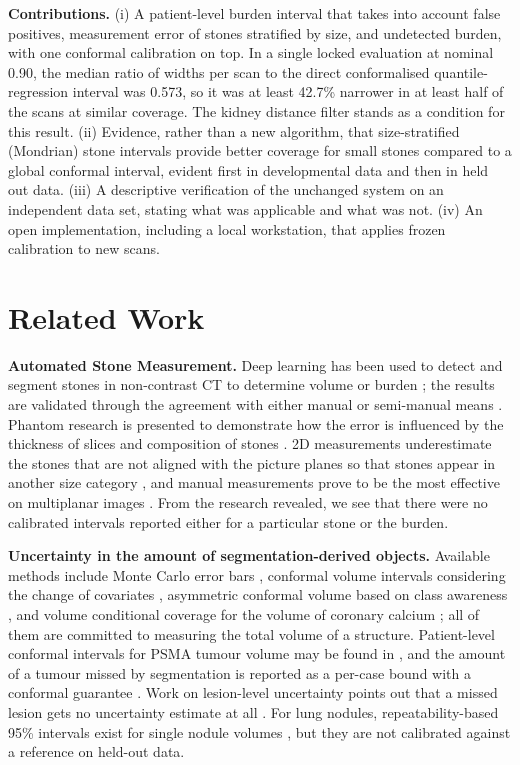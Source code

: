 \documentclass[conference]{IEEEtran}
\begin{document}
\textbf{Contributions.} (i) A patient-level burden interval that takes into account false positives, measurement error of stones stratified by size, and undetected burden, with one conformal calibration on top. In a single locked evaluation at nominal 0.90, the median ratio of widths per scan to the direct conformalised quantile-regression interval was 0.573, so it was at least 42.7\% narrower in at least half of the scans at similar coverage. The kidney distance filter stands as a condition for this result. (ii) Evidence, rather than a new algorithm, that size-stratified (Mondrian) stone intervals provide better coverage for small stones compared to a global conformal interval, evident first in developmental data and then in held out data. (iii) A descriptive verification of the unchanged system on an independent data set, stating what was applicable and what was not. (iv) An open implementation, including a local workstation, that applies frozen calibration to new scans.

\section{Related Work}\label{sec:related}
\textbf{Automated Stone Measurement.} Deep learning has been used to detect and segment stones in non-contrast CT to determine volume or burden \cite{elton2022,li2022,cumpanas2024,mukherjee2023}; the results are validated through the agreement with either manual or semi-manual means \cite{wilhelm2018,neubauer2023}. Phantom research is presented to demonstrate how the error is influenced by the thickness of slices and composition of stones \cite{thongprayoon2026,neubauer2023}. 2D measurements underestimate the stones that are not aligned with the picture planes so that stones appear in another size category \cite{liden2015,berkovitz2010}, and manual measurements prove to be the most effective on multiplanar images \cite{reimer2021}. From the research revealed, we see that there were no calibrated intervals reported either for a particular stone or the burden.

\textbf{Uncertainty in the amount of segmentation-derived objects.} Available methods include Monte Carlo error bars \cite{eatonrosen2018}, conformal volume intervals considering the change of covariates \cite{lambert2024}, asymmetric conformal volume based on class awareness \cite{alijani2026}, and volume conditional coverage for the volume of coronary calcium \cite{jaubert2025}; all of them are committed to measuring the total volume of a structure. Patient-level conformal intervals for PSMA tumour volume may be found in \cite{psmatv2026}, and the amount of a tumour missed by segmentation is reported as a per-case bound with a conformal guarantee \cite{vargas2026}. Work on lesion-level uncertainty points out that a missed lesion gets no uncertainty estimate at all \cite{molchanova2025}. For lung nodules, repeatability-based 95\% intervals exist for single nodule volumes \cite{qiba2023nodule}, but they are not calibrated against a reference on held-out data.
\end{document}
